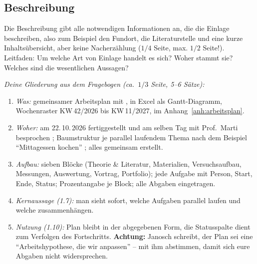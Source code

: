 \subsection{Beschreibung}
\begin{hinweise}
Die Beschreibung gibt alle notwendigen Informationen an, die die Einlage beschreiben, also zum Beispiel den
Fundort, die Literaturstelle und eine kurze Inhaltsübersicht, aber keine Nacherzählung ($1/4$ Seite, max.
$1/2$ Seite!). Leitfaden: Um welche Art von Einlage handelt es sich? Woher stammt sie? Welches sind die
wesentlichen Aussagen?
\end{hinweise}
\begin{hinweise}
\emph{Deine Gliederung aus dem Fragebogen (ca.\ $1/3$ Seite, 5--6 Sätze):}
\begin{enumerate}\itemsep0pt
\item \emph{Was:} gemeinsamer Arbeitsplan mit \Partner, in Excel als Gantt-Diagramm, Wochenraster
      KW\,42/2026 bis KW\,11/2027, im Anhang~\ref{anh:arbeitsplan}.
\item \emph{Woher:} am 22.\,10.\,2026 fertiggestellt und am selben Tag mit Prof.\ Marti besprochen
      \cite{Marti2026Gespraech}; Baumstruktur je parallel laufendem Thema nach dem Beispiel
      \enquote{Mittagessen kochen} \cite{MoodleArbeitsplan2026}; alles gemeinsam erstellt.
\item \emph{Aufbau:} sieben Blöcke (Theorie \& Literatur, Materialien, Versuchsaufbau, Messungen,
      Auswertung, Vortrag, Portfolio); jede Aufgabe mit Person, Start, Ende, Status; Prozentangabe je
      Block; alle Abgaben eingetragen.
\item \emph{Kernaussage (1.7):} man sieht sofort, welche Aufgaben parallel laufen und welche
      zusammenhängen.
\item \emph{Nutzung (1.10):} Plan bleibt in der abgegebenen Form, die Statusspalte dient zum Verfolgen
      des Fortschritts. \textbf{Achtung:} Janosch schreibt, der Plan sei eine \enquote{Arbeitshypothese,
      die wir anpassen} -- mit ihm abstimmen, damit sich eure Abgaben nicht widersprechen.
\end{enumerate}
\end{hinweise}
